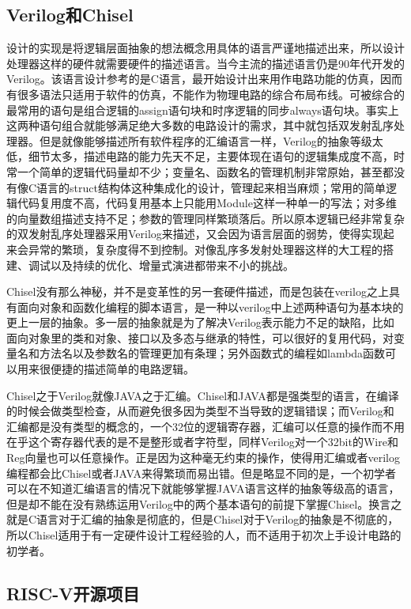 \documentclass[11pt]{article}
\begin{document}
\subsection{Verilog和Chisel}
设计的实现是将逻辑层面抽象的想法概念用具体的语言严谨地描述出来，所以设计处理器这样的硬件就需要硬件的描述语言。当今主流的描述语言仍是90年代开发的Verilog。该语言设计参考的是C语言，最开始设计出来用作电路功能的仿真，因而有很多语法只适用于软件的仿真，不能作为物理电路的综合布局布线。可被综合的最常用的语句是组合逻辑的assign语句块和时序逻辑的同步always语句块。事实上这两种语句组合就能够满足绝大多数的电路设计的需求，其中就包括双发射乱序处理器。但是就像能够描述所有软件程序的汇编语言一样，Verilog的抽象等级太低，细节太多，描述电路的能力先天不足，主要体现在语句的逻辑集成度不高，时常一个简单的逻辑代码量却不少；变量名、函数名的管理机制非常原始，甚至都没有像C语言的struct结构体这种集成化的设计，管理起来相当麻烦；常用的简单逻辑代码复用度不高，代码复用基本上只能用Module这样一种单一的写法；对多维的向量数组描述支持不足；参数的管理同样繁琐落后。所以原本逻辑已经非常复杂的双发射乱序处理器采用Verilog来描述，又会因为语言层面的弱势，使得实现起来会异常的繁琐，复杂度得不到控制。对像乱序多发射处理器这样的大工程的搭建、调试以及持续的优化、增量式演进都带来不小的挑战。

Chisel没有那么神秘，并不是变革性的另一套硬件描述，而是包装在verilog之上具有面向对象和函数化编程的脚本语言，是一种以verilog中上述两种语句为基本块的更上一层的抽象。多一层的抽象就是为了解决Verilog表示能力不足的缺陷，比如面向对象里的类和对象、接口以及多态与继承的特性，可以很好的复用代码，对变量名和方法名以及参数名的管理更加有条理；另外函数式的编程如lambda函数可以用来很便捷的描述简单的电路逻辑。

Chisel之于Verilog就像JAVA之于汇编。Chisel和JAVA都是强类型的语言，在编译的时候会做类型检查，从而避免很多因为类型不当导致的逻辑错误；而Verilog和汇编都是没有类型的概念的，一个32位的逻辑寄存器，汇编可以任意的操作而不用在乎这个寄存器代表的是不是整形或者字符型，同样Verilog对一个32bit的Wire和Reg向量也可以任意操作。正是因为这种毫无约束的操作，使得用汇编或者verilog编程都会比Chisel或者JAVA来得繁琐而易出错。但是略显不同的是，一个初学者可以在不知道汇编语言的情况下就能够掌握JAVA语言这样的抽象等级高的语言，但是却不能在没有熟练运用Verilog中的两个基本语句的前提下掌握Chisel。换言之就是C语言对于汇编的抽象是彻底的，但是Chisel对于Verilog的抽象是不彻底的，所以Chisel适用于有一定硬件设计工程经验的人，而不适用于初次上手设计电路的初学者。
\subsection{RISC-V开源项目}
\end{document}
